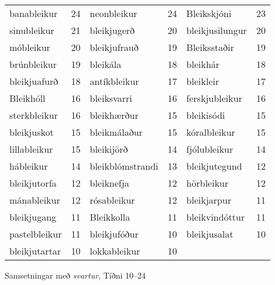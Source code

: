 \documentclass[../samsetningasafn.tex]{subfiles}
\begin{document}
\begin{wordlist}[H]
\begin{tcolorbox}

	\setlength{\extrarowheight}{3pt}
	\begin{tabular}{BlBlBl}	
		banableikur		& 24		& 	
		neonbleikur		& 24		& 	
		Bleikskjóni		& 23		\\ 	
		sinubleikur		& 21		& 	
		bleikjugerð		& 20		& 	
		bleikjusilungur	& 20		\\ 	
		móbleikur		& 20		& 	
		bleikjufrauð		& 19		& 
		Bleiksstaðir		& 19		\\ 	
		brúnbleikur		& 19		& 		
		bleikála			& 18		& 	
		bleikhár			& 18		\\ 	
		bleikjuafurð		& 18		& 
		antíkbleikur		& 17		& 		
		bleikleir			& 17		\\ 
		Bleikhóll			& 16		& 	
		bleiksvarri		& 16		& 	
		ferskjubleikur	& 16		\\ 	
		sterkbleikur		& 16		& 		
		bleikhærður		& 15		& 	
		bleikisódi		& 15		\\ 	
		bleikjuskot		& 15		& 	
		bleikmálaður		& 15		& 
		kóralbleikur		& 15		\\ 
		lillableikur		& 15		& 	
		bleikijörð		& 14		& 	
		fjólubleikur		& 14		\\ 	
		hábleikur		& 14		& 
		bleikblómstrandi	& 13		& 	
		bleikjutegund	& 12		\\ 
		bleikjutorfa		& 12		& 	
		bleiknefja		& 12		& 	
		hörbleikur		& 12		\\ 	
		mánableikur		& 12		& 	
		rósableikur		& 12		& 	
		bleikjarpur		& 11		\\ 	
		bleikjugang		& 11		& 
		Bleikkolla		& 11		& 	
		bleikvindóttur	& 11  		\\ 
		pastelbleikur		& 11		& 		
		bleikjufóður		& 10		& 	
		bleikjusalat		& 10		\\ 	
		bleikjutartar		& 10		& 		
		lokkableikur		& 10		& 		
						&
	\end{tabular}

\end{tcolorbox}
	\caption{Samsetningar með \textit{svartur}, Tíðni 10--24}
	\label{listi:svart.10}
\end{wordlist}
\end{document}
